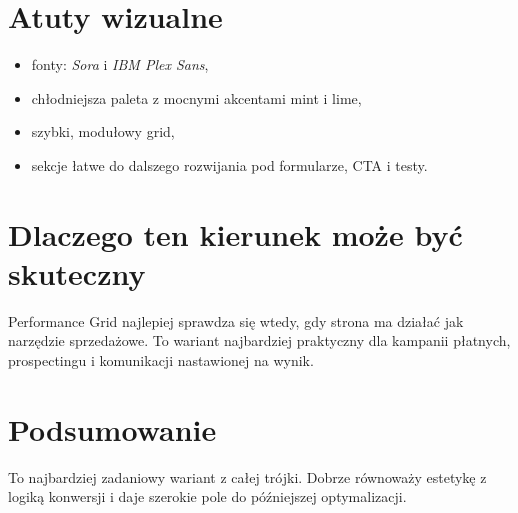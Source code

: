 \documentclass[11pt,a4paper]{article}
\begin{document}
\section*{Atuty wizualne}
\begin{itemize}
  \item fonty: \textit{Sora} i \textit{IBM Plex Sans},
  \item chłodniejsza paleta z mocnymi akcentami mint i lime,
  \item szybki, modułowy grid,
  \item sekcje łatwe do dalszego rozwijania pod formularze, CTA i testy.
\end{itemize}

\section*{Dlaczego ten kierunek może być skuteczny}
Performance Grid najlepiej sprawdza się wtedy, gdy strona ma działać jak narzędzie sprzedażowe. To wariant najbardziej praktyczny dla kampanii płatnych, prospectingu i komunikacji nastawionej na wynik.

\section*{Podsumowanie}
To najbardziej zadaniowy wariant z całej trójki. Dobrze równoważy estetykę z logiką konwersji i daje szerokie pole do późniejszej optymalizacji.
\end{document}
